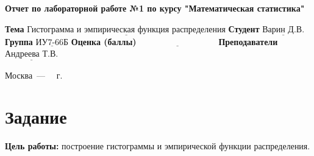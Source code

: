 \documentclass[12pt]{report}
\begin{document}
\begin{titlepage}
  \begin{center}
        \Large\textbf{Отчет по лабораторной работе №1 по курсу "Математическая статистика"}
    \end{center}
	
	\noindent\textbf{Тема} $\underline{\text{Гистограмма и эмпирическая функция распределения}}$\newline\newline
	\noindent\textbf{Студент} $\underline{\text{Варин Д.В.}}$\newline\newline
	\noindent\textbf{Группа} $\underline{\text{ИУ7-66Б}}$\newline\newline
	\noindent\textbf{Оценка (баллы)} $\underline{\text{~~~~~~~~~~~~~~~~~~~~~~~~~~~}}$\newline\newline
	\noindent\textbf{Преподаватели} $\underline{\text{Андреева Т.В.}}$\newline\newline\newline
	
	\begin{center}
		\vfill
		Москва~---~\the\year
		~г.
	\end{center}
\end{titlepage}

\renewcommand{\thefigure}{\thesection.\arabic{figure}} 
\renewcommand{\thetable}{\thesection.\arabic{table}} 
\renewcommand{\thelstlisting}{\thesection.\arabic{lstlisting}} 


\renewcommand*\thesection{\arabic{section}}


\section{Задание}

\textbf{Цель работы:} построение гистограммы и эмпирической функции распределения.
\end{document}
